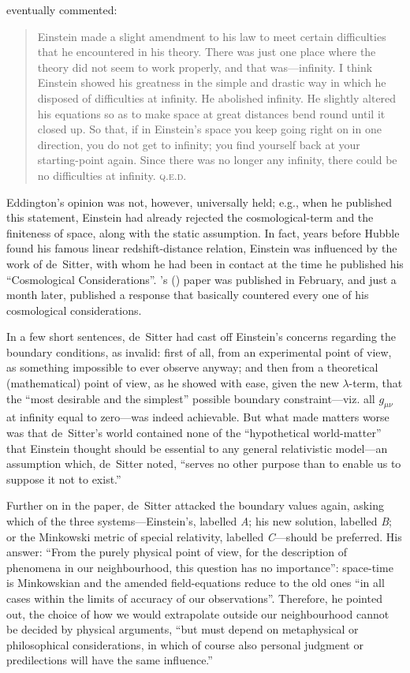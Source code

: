 \documentclass[12 pt]{article}
\def\citeapos#1{\citeauthor{#1}'s (\citeyear{#1})}
\begin{document}
\citet{Eddington1933} eventually commented: 
\begin{quotation}
Einstein made a slight amendment to his law to meet certain difficulties that he encountered in his theory. There was just one place where the theory did not seem to work properly, and that was---infinity. I think Einstein showed his greatness in the simple and drastic way in which he disposed of difficulties at infinity. He abolished infinity. He slightly altered his equations so as to make space at great distances bend round until it closed up. So that, if in Einstein's space you keep going right on in one direction, you do not get to infinity; you find yourself back at your starting-point again. Since there was no longer any infinity, there could be no difficulties at infinity. \textsc{q.e.d.}
\end{quotation}
Eddington's opinion was not, however, universally held; e.g., when he published this statement, Einstein had already rejected the cosmological-term and the finiteness of space, along with the static assumption. In fact, years before Hubble found his famous linear redshift-distance relation, Einstein was influenced by the work of de~Sitter, with whom he had been in contact at the time he published his ``Cosmological Considerations''. \citeapos{Einstein1917} paper was published in February, and just a month later, \citet{deSitter1917a} published a response that basically countered every one of his cosmological considerations.

In a few short sentences, de~Sitter had cast off Einstein's concerns regarding the boundary conditions, as invalid: first of all, from an experimental point of view, as something impossible to ever observe anyway; and then from a theoretical (mathematical) point of view, as he showed with ease, given the new $\lambda$-term, that the ``most desirable and the simplest'' possible boundary constraint---viz. all $g_{\mu\nu}$ at infinity equal to zero---was indeed achievable. But what made matters worse was that de~Sitter's world contained none of the ``hypothetical world-matter'' that Einstein thought should be essential to any general relativistic model---an assumption which, de~Sitter noted, ``serves no other purpose than to enable us to suppose it not to exist.'' 

Further on in the paper, de~Sitter attacked the boundary values again, asking which of the three systems---Einstein's, labelled \textit{A}; his new solution, labelled \textit{B}; or the Minkowski metric of special relativity, labelled \textit{C}---should be preferred. His answer: ``From the purely physical point of view, for the description of phenomena in our neighbourhood, this question has no importance'': space-time is Minkowskian and the amended field-equations reduce to the old ones ``in all cases within the limits of accuracy of our observations''. Therefore, he pointed out, the choice of how we would extrapolate outside our neighbourhood cannot be decided by physical arguments, ``but must depend on metaphysical or philosophical considerations, in which of course also personal judgment or predilections will have the same influence.''
\end{document}
